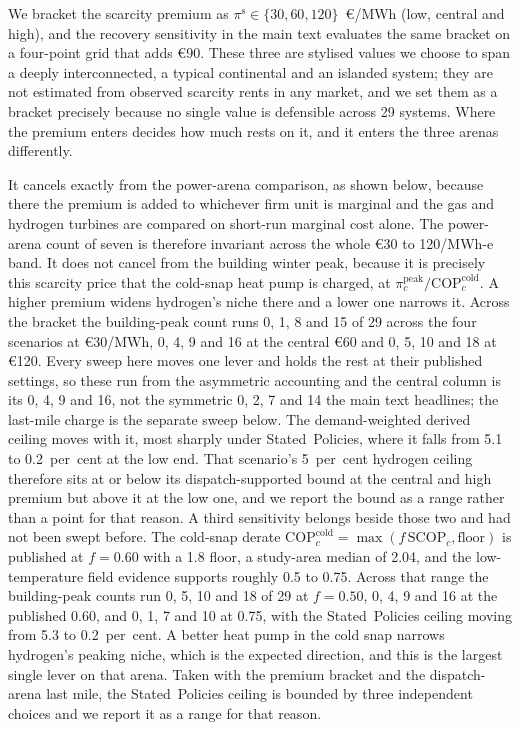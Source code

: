 We bracket the scarcity premium as $\pi^{\mathrm{s}}\in\{30,60,120\}$~\euro{}/MWh (low,
central and high), and the recovery sensitivity in the main text evaluates the same
bracket on a four-point grid that adds \euro{}90. These three are stylised values we choose to span a deeply
interconnected, a typical continental and an islanded system; they are not estimated
from observed scarcity rents in any market, and we set them as a bracket precisely
because no single value is defensible across 29 systems. Where the premium enters decides
how much rests on it, and it enters the three arenas differently.

It cancels exactly from the power-arena comparison, as shown below, because there the
premium is added to whichever firm unit is marginal and the gas and hydrogen turbines are
compared on short-run marginal cost alone. The power-arena count of seven is therefore
invariant across the whole \euro{}30 to 120/MWh-e band. It does not cancel from the
building winter peak, because it is precisely this scarcity price that the cold-snap heat
pump is charged, at $\pi^{\mathrm{peak}}_{c}/\mathrm{COP}^{\mathrm{cold}}_{c}$. A higher
premium widens hydrogen's niche there and a lower one narrows it. Across the bracket
the building-peak count runs 0, 1, 8 and 15 of 29 across the four scenarios at
\euro{}30/MWh, 0, 4, 9 and 16 at the central \euro{}60 and 0, 5, 10 and 18 at
\euro{}120. Every sweep here moves one lever and holds the rest at their published
settings, so these run from the asymmetric accounting and the central column is its
0, 4, 9 and 16, not the symmetric 0, 2, 7 and 14 the main text headlines; the last-mile
charge is the separate sweep below.
The demand-weighted derived ceiling moves with it, most sharply under
Stated~Policies, where it falls from 5.1 to 0.2~per~cent at the low end. That scenario's
5~per~cent hydrogen ceiling therefore sits at or below its dispatch-supported bound at the
central and high premium but above it at the low one, and we report the bound as a range
rather than a point for that reason. A third sensitivity belongs beside those two and had not been swept before. The
cold-snap derate $\mathrm{COP}^{\mathrm{cold}}_{c}=\max(f\,\mathrm{SCOP}_{c},
\text{floor})$ is published at $f=0.60$ with a 1.8 floor, a study-area median of 2.04,
and the low-temperature field evidence supports roughly 0.5 to 0.75. Across that range
the building-peak counts run 0, 5, 10 and 18 of 29 at $f=0.50$, 0, 4, 9 and 16 at the
published 0.60, and 0, 1, 7 and 10 at 0.75, with the Stated~Policies ceiling moving from
5.3 to 0.2~per~cent. A better heat pump in the cold snap narrows hydrogen's peaking
niche, which is the expected direction, and this is the largest single lever on that
arena. Taken with the premium bracket and the dispatch-arena last mile, the
Stated~Policies ceiling is bounded by three independent choices and we report it as a
range for that reason.

